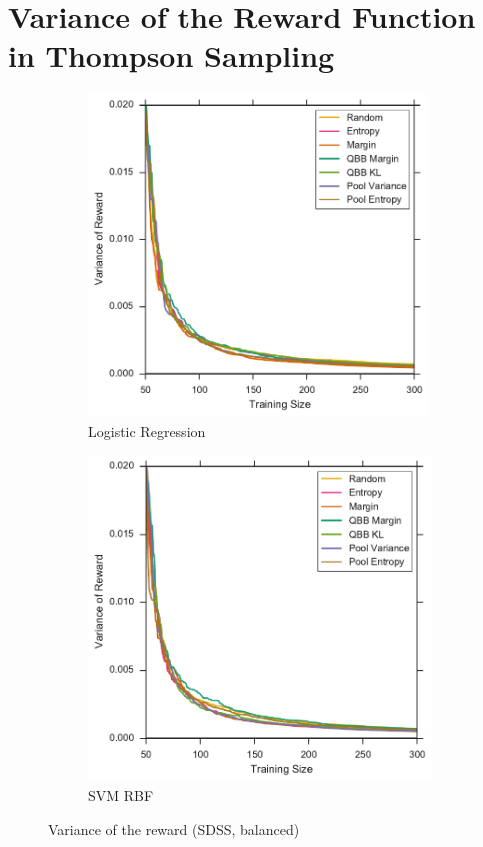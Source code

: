 \section{Variance of the Reward Function in Thompson Sampling}


\begin{figure}[p]
	\centering
	\begin{subfigure}{.5\textwidth}
		\centering
		\includegraphics[width=0.99\textwidth]{figures/5_thompson/sdss_bl_sigmas}
		\caption{Logistic Regression}
		\label{fig:sdss_bl_sigmas}
	\end{subfigure}%
	\begin{subfigure}{.5\textwidth}
		\centering
		\includegraphics[width=0.99\linewidth]{figures/5_thompson/sdss_br_sigmas}
		\caption{SVM RBF}
		\label{fig:sdss_br_sigmas}
	\end{subfigure}
	\caption[Variance of the reward (SDSS, balanced)]{
		Variance of the reward (SDSS, balanced)}
	\label{fig:sdss_b_sigmas}
\end{figure}

